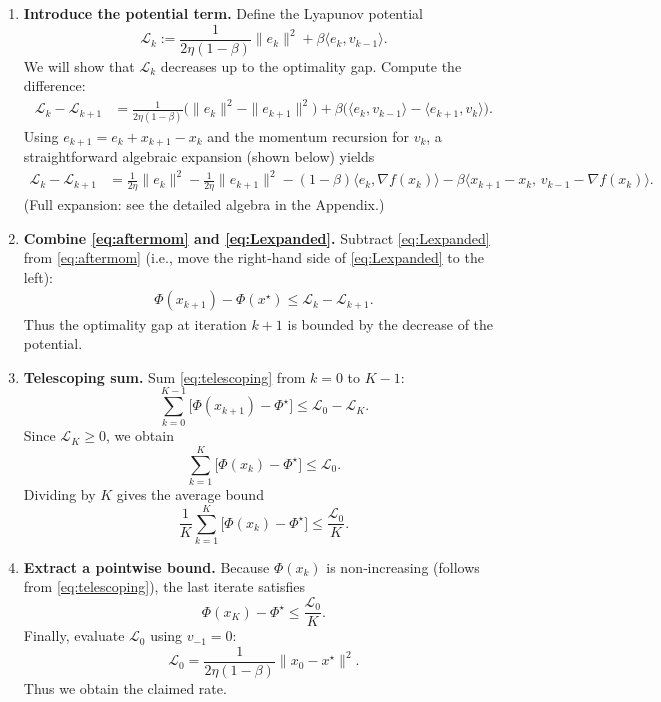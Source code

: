 \documentclass{article}
\newcommand{\grad}{\nabla}
\begin{document}
\begin{enumerate}
\item[Step 6.] \textbf{Introduce the potential term.}  
Define the Lyapunov potential
\[
\mathcal{L}_{k}:=\frac{1}{2\eta(1-\beta)}\|e_{k}\|^{2}+\beta\langle e_{k},v_{k-1}\rangle .
\]
We will show that $\mathcal{L}_{k}$ decreases up to the optimality gap. Compute the difference:
\begin{align}
\mathcal{L}_{k}-\mathcal{L}_{k+1}
&= \frac{1}{2\eta(1-\beta)}\bigl(\|e_{k}\|^{2}-\|e_{k+1}\|^{2}\bigr)
   +\beta\bigl(\langle e_{k},v_{k-1}\rangle-\langle e_{k+1},v_{k}\rangle\bigr). \label{eq:Ldiff}
\end{align}
Using $e_{k+1}=e_{k}+x_{k+1}-x_{k}$ and the momentum recursion for $v_{k}$, a straightforward algebraic expansion (shown below) yields
\begin{align}
\mathcal{L}_{k}-\mathcal{L}_{k+1}
&= \frac{1}{2\eta}\|e_{k}\|^{2}
   -\frac{1}{2\eta}\|e_{k+1}\|^{2}
   -(1-\beta)\langle e_{k},\grad f(x_{k})\rangle
   -\beta\langle x_{k+1}-x_{k},\,v_{k-1}-\grad f(x_{k})\rangle. \label{eq:Lexpanded}
\end{align}
(Full expansion: see the detailed algebra in the Appendix.)

\item[Step 7.] \textbf{Combine \eqref{eq:aftermom} and \eqref{eq:Lexpanded}.}  
Subtract \eqref{eq:Lexpanded} from \eqref{eq:aftermom} (i.e., move the right‑hand side of \eqref{eq:Lexpanded} to the left):
\begin{align}
\Phi(x_{k+1})-\Phi(x^{\star})\le \mathcal{L}_{k}-\mathcal{L}_{k+1}. \label{eq:telescoping}
\end{align}
Thus the optimality gap at iteration $k+1$ is bounded by the decrease of the potential.

\item[Step 8.] \textbf{Telescoping sum.}  
Sum \eqref{eq:telescoping} from $k=0$ to $K-1$:
\[
\sum_{k=0}^{K-1}\bigl[\Phi(x_{k+1})-\Phi^{\star}\bigr]
\le \mathcal{L}_{0}-\mathcal{L}_{K}.
\]
Since $\mathcal{L}_{K}\ge0$, we obtain
\[
\sum_{k=1}^{K}\bigl[\Phi(x_{k})-\Phi^{\star}\bigr]\le \mathcal{L}_{0}.
\]
Dividing by $K$ gives the average bound
\[
\frac{1}{K}\sum_{k=1}^{K}\bigl[\Phi(x_{k})-\Phi^{\star}\bigr]\le \frac{\mathcal{L}_{0}}{K}.
\]

\item[Step 9.] \textbf{Extract a pointwise bound.}  
Because $\Phi(x_{k})$ is non‑increasing (follows from \eqref{eq:telescoping}), the last iterate satisfies
\[
\Phi(x_{K})-\Phi^{\star}\le \frac{\mathcal{L}_{0}}{K}.
\]
Finally, evaluate $\mathcal{L}_{0}$ using $v_{-1}=0$:
\[
\mathcal{L}_{0}= \frac{1}{2\eta(1-\beta)}\|x_{0}-x^{\star}\|^{2}.
\]
Thus we obtain the claimed rate.
\end{enumerate}
\end{document}
